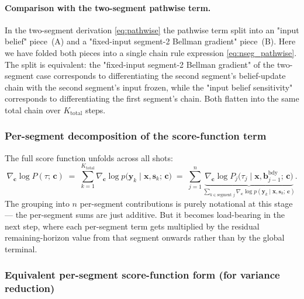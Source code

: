 \documentclass[11pt,a4paper]{article}
\newcommand{\bc}{\bm{c}}
\newcommand{\bx}{\bm{x}}
\newcommand{\by}{\bm{y}}
\newcommand{\bs}{\bm{s}}
\newcommand{\bb}{\bm{b}}
\begin{document}
\paragraph{Comparison with the two-segment pathwise term.}  In the two-segment derivation
\eqref{eq:pathwise} the pathwise term split into an "input belief" piece~(A) and a
"fixed-input segment-2 Bellman gradient" piece~(B).  Here we have folded both pieces into
a single chain rule expression \eqref{eq:nseg_pathwise}.  The split is equivalent: the
"fixed-input segment-2 Bellman gradient" of the two-segment case corresponds to differentiating
the second segment's belief-update chain with the second segment's input frozen, while the
"input belief sensitivity" corresponds to differentiating the first segment's chain.  Both
flatten into the same total chain over $K_\mathrm{total}$ steps.

\subsubsection{Per-segment decomposition of the score-function term}
\label{sec:nseg_score}

The full score function unfolds across all shots:
\begin{equation}
\nabla_{\bc} \log P(\tau;\, \bc)
\;=\;
\sum_{k=1}^{K_\mathrm{total}} \nabla_{\bc} \log p\bigl(\by_k \mid \bx, \bs_k;\, \bc\bigr)
\;=\;
\sum_{j=1}^{n} \underbrace{\nabla_{\bc} \log P_j\bigl(\tau_j \mid \bx, \bb^{\mathrm{bdy}}_{j-1};\, \bc\bigr)}_{\sum_{k \in \text{segment } j} \nabla_{\bc} \log p(\by_k \mid \bx, \bs_k;\, \bc)}.
\label{eq:nseg_score_decomp}
\end{equation}
The grouping into $n$ per-segment contributions is purely notational at this stage — the
per-segment sums are just additive.  But it becomes load-bearing in the next step, where
each per-segment term gets multiplied by the residual remaining-horizon value from that
segment onwards rather than by the global terminal.

\subsubsection{Equivalent per-segment score-function form (for variance reduction)}
\label{sec:nseg_perseg}
\end{document}
